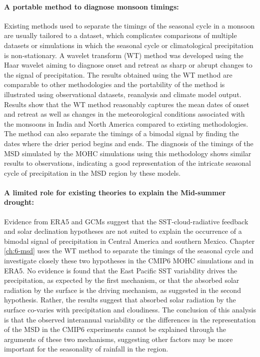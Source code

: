 \paragraph{A portable method to diagnose monsoon timings:}
Existing methods used to separate the timings of the seasonal cycle in a monsoon are usually tailored to a dataset, which complicates comparisons of multiple datasets or simulations in which the seasonal cycle or climatological precipitation is non-stationary. 
A wavelet transform (WT) method was developed using the Haar wavelet aiming to diagnose onset and retreat as sharp or abrupt changes to the signal of precipitation.
The results obtained using the WT method are comparable to other methodologies and the portability of the method is illustrated using observational datasets, reanalysis and climate model output. 
Results show that the WT method reasonably captures the mean dates of onset and retreat as well as changes in the meteorological conditions associated with the monsoons in India and North America compared to existing methodologies. 
The method can also separate the timings of a bimodal signal by finding the dates where the drier period begins and ends. 
The diagnosis of the timings of the MSD simulated by the MOHC simulations using this methodology shows similar results to observations, indicating a good representation of the intricate seasonal cycle of precipitation in the MSD region by these models.


\paragraph{A limited role for existing theories to explain the Mid-summer drought:}
Evidence from ERA5 and GCMs suggest that the SST-cloud-radiative feedback and solar declination hypotheses are not suited to explain the occurrence of a bimodal signal of precipitation in Central America and  southern Mexico.
Chapter \ref{ch:6-msd} uses the WT method to separate the timings of the seasonal cycle and investigate closely these two hypotheses in the CMIP6 MOHC simulations and in ERA5.
No evidence is found that the East Pacific SST variability drives the precipitation, as expected by the first mechanism, or that the absorbed solar radiation by the surface is the driving mechanism, as suggested in the second hypothesis.
 Rather, the results suggest that absorbed solar radiation by the surface co-varies with precipitation and cloudiness.
The conclusion of this analysis is that the observed interannual variability or the differences in the representation of the MSD in the CMIP6 experiments cannot be explained through the arguments of these two mechanisms, suggesting other factors may be more important for the seasonality of rainfall in the region. 

